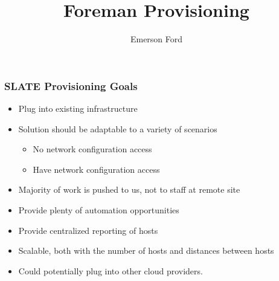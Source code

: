 \documentclass{beamer}
\title{Foreman Provisioning}
\author{Emerson Ford}
\date{}
\begin{document}
\frame{\titlepage}

\begin{frame}
	\frametitle{SLATE Provisioning Goals}
	\begin{itemize}
		\item Plug into existing infrastructure
		\item Solution should be adaptable to a variety of scenarios
		      \begin{itemize}
			      \item No network configuration access
			      \item Have network configuration access
		      \end{itemize}
		\item Majority of work is pushed to us, not to staff at remote site
		\item Provide plenty of automation opportunities
		\item Provide centralized reporting of hosts
		\item Scalable, both with the number of hosts and distances between hosts
		\item Could potentially plug into other cloud providers.
	\end{itemize}
\end{frame}
\end{document}
